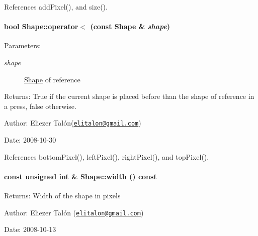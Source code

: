 References addPixel(), and size().\hypertarget{class_shape_183a6bc428172ced8122ffb68d0f04ef}{
\paragraph[operator$<$]{\setlength{\rightskip}{0pt plus 5cm}bool Shape::operator$<$ (const {\bf Shape} \& {\em shape})}\hfill}
\label{class_shape_183a6bc428172ced8122ffb68d0f04ef}


\begin{Desc}
\item[Parameters:]
\begin{description}
\item[{\em shape}]\hyperlink{class_shape}{Shape} of reference\end{description}
\end{Desc}
\begin{Desc}
\item[Returns:]True if the current shape is placed before than the shape of reference in a press, false otherwise.\end{Desc}
\begin{Desc}
\item[Author:]Eliezer Talón(\href{mailto:elitalon@gmail.com}{\tt elitalon@gmail.com}) \end{Desc}
\begin{Desc}
\item[Date:]2008-10-30 \end{Desc}


References bottomPixel(), leftPixel(), rightPixel(), and topPixel().\hypertarget{class_shape_6773dfedb96ef750e5469e22d51ecf0f}{
\paragraph[width]{\setlength{\rightskip}{0pt plus 5cm}const unsigned int \& Shape::width () const}\hfill}
\label{class_shape_6773dfedb96ef750e5469e22d51ecf0f}


\begin{Desc}
\item[Returns:]Width of the shape in pixels\end{Desc}
\begin{Desc}
\item[Author:]Eliezer Talón (\href{mailto:elitalon@gmail.com}{\tt elitalon@gmail.com}) \end{Desc}
\begin{Desc}
\item[Date:]2008-10-13 \end{Desc}


